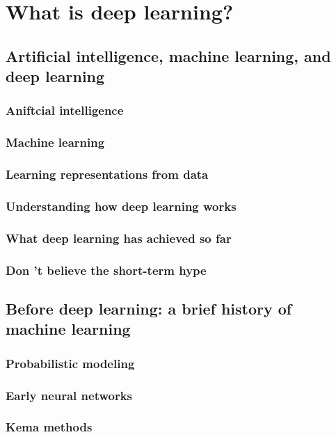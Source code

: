 \documentclass[a4paper,twoside,openany]{book}
\begin{document}
	\pagebreak
	
	\chapter{What is deep learning?} 
	\section{Artificial intelligence, machine learning, and deep learning}	
		\subsection{Aniftcial intelligence}
		\subsection{Machine learning} 
		\subsection{Learning representations from data} 
		\subsection{Understanding how deep learning works} 
		\subsection{What deep learning has achieved so far} 
		\subsection{Don 't believe the short-term hype} 
	\section{Before deep learning: a brief history of machine learning}
		\subsection{Probabilistic modeling} 
		\subsection{Early neural networks} 
		\subsection{Kema methods} 
\end{document}
